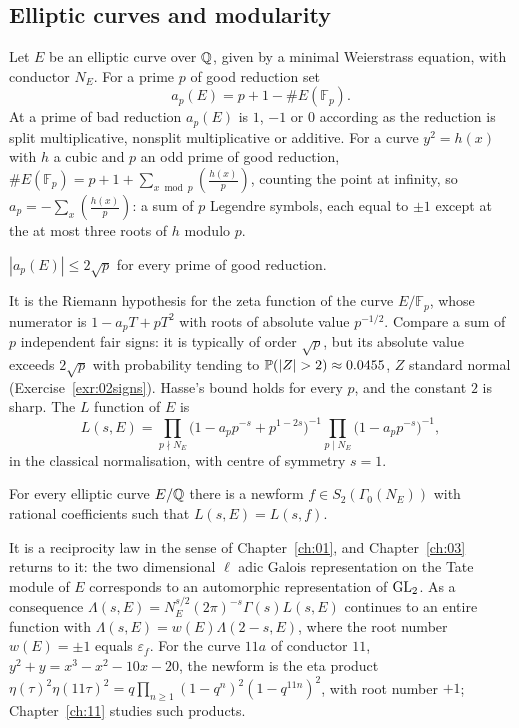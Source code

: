 \subsection{Elliptic curves and modularity}
Let $E$ be an elliptic curve over $\mathbb{Q}$, given by a minimal Weierstrass equation, with conductor $N_E$. For a prime $p$ of good reduction set
\[
a_p(E)=p+1-\#E(\mathbb F_p).
\]
At a prime of bad reduction $a_p(E)$ is $1$, $-1$ or $0$ according as the reduction is split multiplicative, nonsplit multiplicative or additive. For a curve $y^2=h(x)$ with $h$ a cubic and $p$ an odd prime of good reduction, $\#E(\mathbb F_p)=p+1+\sum_{x\bmod p}\left(\frac{h(x)}{p}\right)$, counting the point at infinity, so $a_p=-\sum_x\left(\frac{h(x)}{p}\right)$: a sum of $p$ Legendre symbols, each equal to $\pm1$ except at the at most three roots of $h$ modulo $p$.

\begin{theorem}[Hasse]
$|a_p(E)|\le2\sqrt p$ for every prime of good reduction.
\end{theorem}

It is the Riemann hypothesis for the zeta function of the curve $E/\mathbb F_p$, whose numerator is $1-a_pT+pT^2$ with roots of absolute value $p^{-1/2}$. Compare a sum of $p$ independent fair signs: it is typically of order $\sqrt p$, but its absolute value exceeds $2\sqrt p$ with probability tending to $\Prob(|Z|>2)\approx0.0455$, $Z$ standard normal (Exercise~\ref{exr:02signs}). Hasse's bound holds for every $p$, and the constant $2$ is sharp. The $L$ function of $E$ is
\[
L(s,E)=\prod_{p\nmid N_E}\bigl(1-a_pp^{-s}+p^{1-2s}\bigr)^{-1}\prod_{p\mid N_E}\bigl(1-a_pp^{-s}\bigr)^{-1},
\]
in the classical normalisation, with centre of symmetry $s=1$.

\begin{theorem}\label{thm:02modularity}
For every elliptic curve $E/\mathbb{Q}$ there is a newform $f\in S_2(\Gamma_0(N_E))$ with rational coefficients such that $L(s,E)=L(s,f)$.
\end{theorem}

It is a reciprocity law in the sense of Chapter~\ref{ch:01}, and Chapter~\ref{ch:03} returns to it: the two dimensional $\ell$ adic Galois representation on the Tate module of $E$ corresponds to an automorphic representation of $\mathrm{GL}_2$. As a consequence $\Lambda(s,E)=N_E^{s/2}(2\pi)^{-s}\Gamma(s)L(s,E)$ continues to an entire function with $\Lambda(s,E)=w(E)\Lambda(2-s,E)$, where the root number $w(E)=\pm1$ equals $\varepsilon_f$. For the curve $11a$ of conductor $11$, $y^2+y=x^3-x^2-10x-20$, the newform is the eta product $\eta(\tau)^2\eta(11\tau)^2=q\prod_{n\ge1}(1-q^n)^2(1-q^{11n})^2$, with root number $+1$; Chapter~\ref{ch:11} studies such products.

